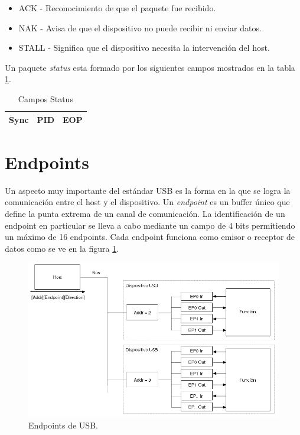 \begin{itemize}
 \item ACK - Reconocimiento de que el paquete fue recibido.
 \item NAK - Avisa de que el dispositivo no puede recibir ni enviar datos.
 \item STALL - Significa que el dispositivo necesita la intervenci\'on del
host.
\end{itemize}

Un paquete \emph{status} esta formado por los siguientes campos mostrados en la
tabla \ref{tab:usb_status_fields}.

\begin{table}[ht]
\centering
\begin{tabular}{|c|c|c|} \hline
Sync & PID & EOP\\ \hline
\end{tabular}
\caption{Campos Status} 
\label{tab:usb_status_fields}
\end{table}


\clearpage
\section{Endpoints}\label{cap:usb_endpoints}
Un aspecto muy importante del est\'andar USB es la forma en la que se logra la
comunicaci\'on entre el host y el dispositivo.
Un \emph{endpoint} es un buffer \'unico que define la punta extrema de un
canal de comunicaci\'on. La identificaci\'on de un endpoint en particular se
lleva a cabo mediante un campo de 4 bits permitiendo un m\'aximo de 16
endpoints. Cada endpoint funciona como emisor o receptor de datos como se ve en
la figura \ref{fig:usb_endpoints}.

\begin{figure}[htp]
\centering
\includegraphics[scale=0.5]{./img/usb_endpoints.png}
\caption{Endpoints de USB.}
\label{fig:usb_endpoints}
\end{figure}


